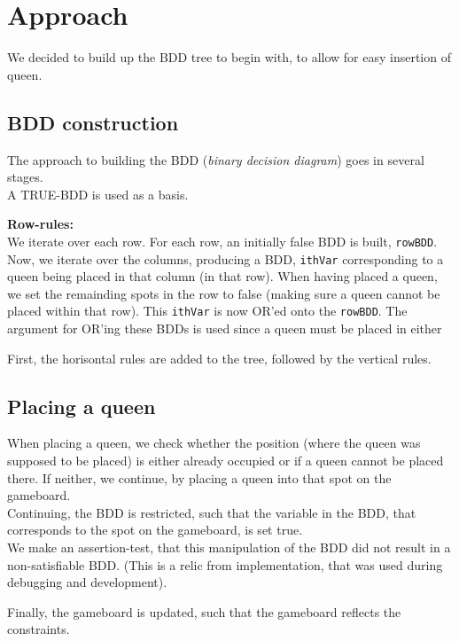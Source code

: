 
\section{Approach}
We decided to build up the BDD tree to begin with, to allow for easy insertion of queen. 

\subsection{BDD construction}
The approach to building the BDD (\textit{binary decision diagram}) goes in several stages.\\
A TRUE-BDD is used as a basis. 

\textbf{Row-rules:}\\
We iterate over each row. For each row, an initially false BDD is built, \texttt{rowBDD}. Now, we iterate over the columns, producing a BDD, \texttt{ithVar} corresponding to a queen being placed in that column (in that row). When having placed a queen, we set the remainding spots in the row to false (making sure a queen cannot be placed within that row). This \texttt{ithVar} is now OR'ed onto the \texttt{rowBDD}. The argument for OR'ing these BDDs is used since a queen must be placed in either

First, the horisontal rules are added to the tree, followed by the vertical rules. 

\subsection{Placing a queen}
When placing a queen, we check whether the position (where the queen was supposed to be placed) is either already occupied or if a queen cannot be placed there. If neither, we continue, by placing a queen into that spot on the gameboard. \\

Continuing, the BDD is restricted, such that the variable in the BDD, that corresponds to the spot on the gameboard, is set true. \\

We make an assertion-test, that this manipulation of the BDD did not result in a non-satisfiable BDD. (This is a relic from implementation, that was used during debugging and development). 

Finally, the gameboard is updated, such that the gameboard reflects the constraints. \\

